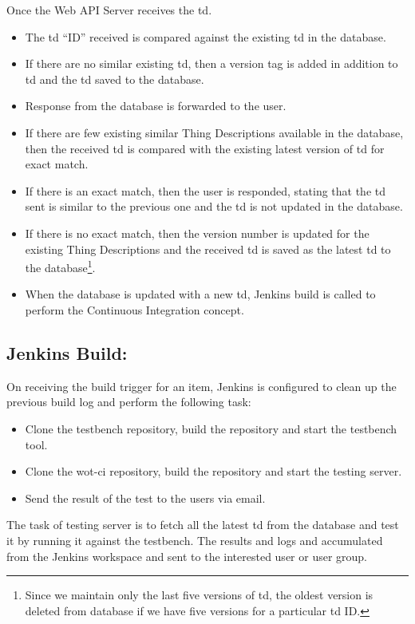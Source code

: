 \documentclass[conference]{IEEEtran}
\theoremstyle{definition}
\begin{document}
Once the Web API Server receives the \ac{td}.
\begin{itemize}
  \item The \ac{td} “ID” received is compared against the existing \ac{td} in the database.
  \item If there are no similar existing \ac{td}, 
    \subitem then a version tag is added in addition to \ac{td} and the \ac{td} saved to the database.
  \item Response from the database is forwarded to the user.
  \item If there are few existing similar Thing Descriptions available in the database, 
    \subitem then the received \ac{td} is compared with the existing latest version of \ac{td} for exact match.
  \item If there is an exact match,
    \subitem then the user is responded, stating that the \ac{td} sent is similar to the previous one and the \ac{td} is not updated in the database.
  \item If there is no exact match,
    \subitem then the version number is updated for the existing Thing Descriptions and the received \ac{td} is saved as the latest \ac{td} to the database\footnote{Since we maintain only the last five versions of \ac{td}, the oldest version is deleted from database if we have five versions for a particular \ac{td} ID.}.
  \item When the database is updated with a new \ac{td}, Jenkins build is called to perform the Continuous Integration concept.
\end{itemize}

\subsection{Jenkins Build:}
  
On receiving the build trigger for an item, Jenkins is configured to clean up the previous build log and perform the following task:

\begin{itemize}
\item Clone the testbench repository, build the repository and start the testbench tool.
\item Clone the wot-ci repository, build the repository and start the testing server.
\item Send the result of the test to the users via email.
\end{itemize}

The task of testing server is to fetch all the latest \ac{td} from the database and test it by running it against the testbench.
The results and logs and accumulated from the Jenkins workspace and sent to the interested user or user group.
\end{document}
